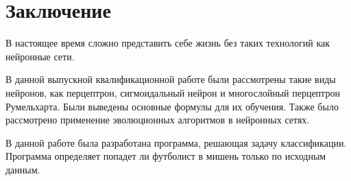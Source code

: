 \newpage

\chapter*{Заключение}

В настоящее время сложно представить себе жизнь без таких технологий как нейронные сети. 

В данной выпускной квалификационной работе были рассмотрены такие виды нейронов, как перцептрон, сигмоидальный нейрон и многослойный перцептрон Румельхарта. Были выведены основные формулы для их обучения. Также было рассмотрено применение эволюционных алгоритмов в нейронных сетях.

В данной работе была разработана программа, решающая задачу классификации. Программа определяет попадет ли футболист в мишень только по исходным данным.